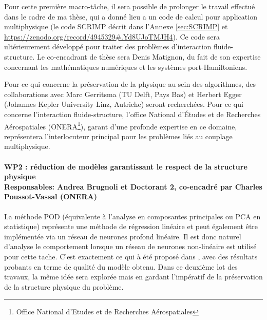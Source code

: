 \documentclass[12pt, french]{article}
\begin{document}
	Pour cette première macro-tâche, il sera possible de prolonger le travail effectué dans le cadre de ma thèse, qui a donn\'e lieu a un code de calcul pour application multiphysique (le code SCRIMP décrit dans l'Annexe \ref{sec:SCRIMP} et \url{https://zenodo.org/record/4945329#.Yd8UJoTMJH4}). Ce code sera ultérieurement développé pour traiter des problèmes d'interaction fluide-structure. Le co-encadrant de thèse sera Denis Matignon, du fait de son expertise concernant les mathématiques numériques et les systèmes port-Hamiltoniens.
	
	Pour ce qui concerne la préservation de la physique au sein des algorithmes, des collaborations avec Marc Gerritsma (TU Delft, Pays Bas) et Herbert Egger (Johannes Kepler University Linz, Autriche) seront recherchées. Pour ce qui concerne l'interaction fluide-structure, l'office National d'Études et de Recherches Aérospatiales (ONERA\footnote{Office National d'Etudes et de Recherches Aérospatiales}), garant d'une profonde expertise en ce domaine, représentera l'interlocuteur principal pour les problèmes liés au couplage multiphysique.
	
	\paragraph[\large WP2 : réduction de modèles garantissant le respect de la structure physique\\
	Responsables: Andrea Brugnoli et Doctorant 2, co-encadré par Charles Poussot-Vassal (ONERA)]{\large WP2 : réduction de modèles garantissant le respect de la structure physique\\
		Responsables: Andrea Brugnoli et Doctorant 2, co-encadré par Charles Poussot-Vassal (ONERA)\\}
	La méthode POD (équivalente \`a l'analyse en composantes principales ou PCA en statistique) représente une méthode de régression linéaire et peut également être implémentée via un réseau de neurones profond linéaire. Il est donc naturel d'analyse le comportement lorsque un réseau de neurones non-linéaire est utilisé pour cette tache. C'est exactement ce qui \`a été proposé dans \cite{lee2020}, avec des résultats probants en terme de qualité du modèle obtenu. Dans ce deuxième lot des travaux, la même idée sera explorée mais en gardant l'impératif de la préservation de la structure physique du problème.
	\vspace{.5cm}
	
\end{document}
